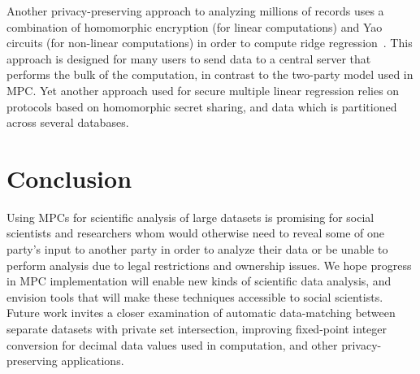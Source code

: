 \documentclass[conference]{IEEEtran}
\begin{document}
Another privacy-preserving approach to analyzing millions of records
uses a combination of homomorphic encryption (for linear computations)
and Yao circuits (for non-linear computations) in order to compute ridge
regression~\cite{ridgeregression}.  This approach is designed for many
users to send data to a central server that performs the bulk of the
computation, in contrast to the two-party model used in MPC. Yet another
approach used for secure multiple linear regression relies on protocols
based on homomorphic secret sharing, and data which is partitioned
across several databases\cite{secretsharing}.
 
\section{Conclusion}

Using MPCs for scientific analysis of large datasets is promising for
social scientists and researchers whom would otherwise need to reveal
some of one party's input to another party in order to analyze their
data or be unable to perform analysis due to legal restrictions and
ownership issues.  We hope progress in MPC implementation will enable
new kinds of scientific data analysis, and envision tools that will make
these techniques accessible to social scientists.  Future work invites a
closer examination of automatic data-matching between separate datasets
with private set intersection, improving fixed-point integer conversion
for decimal data values used in computation, and other
privacy-preserving applications.
\end{document}
